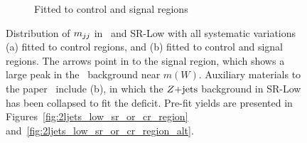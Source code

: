 \begin{figure}[tp]
\begin{subfigure}{0.62\textwidth}
\caption{Fitted to control and signal regions}
\label{fig:2ljets_low_crz_pre_post_post}
\end{subfigure}
\caption[
Distribution of $\mjj$ in CR-Z and SR-Low with all systematic variations
]{%
Distribution of $\mjj$ in \crz\ and SR-Low with all systematic variations
(a) fitted to control regions, and (b) fitted to control and signal regions.
The arrows point in to the signal region, which shows a large peak in the
\diboson\ background near $m(W)$.
Auxiliary materials to the paper~\cite{atlas2022searches} include (b), in which
the $Z\mathrm{+jets}$ background in SR-Low has been collapsed to fit the deficit.
Pre-fit yields are presented in Figures~\ref{fig:2ljets_low_sr_or_cr_region}
and~\ref{fig:2ljets_low_sr_or_cr_region_alt}.
}
\label{fig:2ljets_low_crz_pre_post}
\end{figure}

